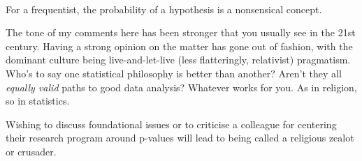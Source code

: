 \documentclass[a4paper, 12pt]{article}
\begin{document}
\

For a frequentist, the probability of a hypothesis is a nonsensical concept.



The tone of my comments here has been stronger that you usually see in the
21st century. Having a strong opinion on the matter has gone out of fashion,
with the dominant culture being live-and-let-live (less flatteringly,
relativist) pragmatism. Who's to say one statistical philosophy is better than
another? Aren't they all {\it equally valid} paths to good data analysis?
Whatever works for you. As in religion, so in statistics.

Wishing to discuss foundational issues or to criticise
a colleague for centering their research program around p-values will lead to
being called a religious zealot or crusader.



\end{document}
